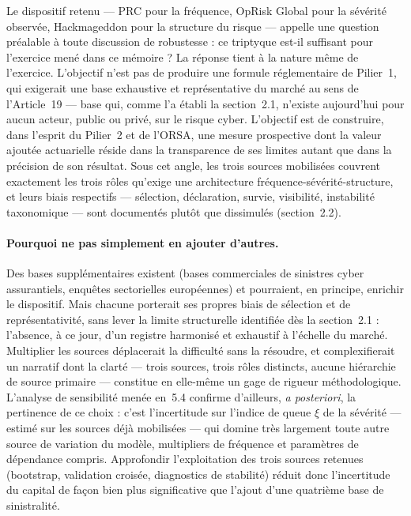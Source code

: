 \documentclass[11pt,a4paper]{article}
\theoremstyle{navystyle}
\theoremstyle{navydef}
\begin{document}
Le dispositif retenu --- PRC pour la fréquence, OpRisk Global pour la
sévérité observée, Hackmageddon pour la structure du risque --- appelle une
question préalable à toute discussion de robustesse : ce triptyque est-il
suffisant pour l'exercice mené dans ce mémoire ? La réponse tient à la nature
même de l'exercice. L'objectif n'est pas de produire une formule
réglementaire de Pilier~1, qui exigerait une base exhaustive et représentative
du marché au sens de l'Article~19 --- base qui, comme l'a établi la
section~2.1, n'existe aujourd'hui pour aucun acteur, public ou privé, sur le
risque cyber. L'objectif est de construire, dans l'esprit du Pilier~2 et de
l'ORSA, une mesure prospective dont la valeur ajoutée actuarielle réside dans
la transparence de ses limites autant que dans la précision de son résultat.
Sous cet angle, les trois sources mobilisées couvrent exactement les trois
rôles qu'exige une architecture fréquence-sévérité-structure, et leurs biais
respectifs --- sélection, déclaration, survie, visibilité, instabilité
taxonomique --- sont documentés plutôt que dissimulés (section~2.2).

\paragraph{Pourquoi ne pas simplement en ajouter d'autres.} Des bases
supplémentaires existent (bases commerciales de sinistres cyber assurantiels,
enquêtes sectorielles européennes) et pourraient, en principe, enrichir le
dispositif. Mais chacune porterait ses propres biais de sélection et de
représentativité, sans lever la limite structurelle identifiée dès la
section~2.1 : l'absence, à ce jour, d'un registre harmonisé et exhaustif à
l'échelle du marché. Multiplier les sources déplacerait la difficulté sans la
résoudre, et complexifierait un narratif dont la clarté --- trois sources, trois
rôles distincts, aucune hiérarchie de \og source primaire\fg{} --- constitue
en elle-même un gage de rigueur méthodologique. L'analyse de sensibilité menée
en~5.4 confirme d'ailleurs, \emph{a posteriori}, la pertinence de ce choix :
c'est l'incertitude sur l'indice de queue $\xi$ de la sévérité --- estimé sur
les sources déjà mobilisées --- qui domine très largement toute autre source
de variation du modèle, multipliers de fréquence et paramètres de dépendance
compris. Approfondir l'exploitation des trois sources retenues (bootstrap,
validation croisée, diagnostics de stabilité) réduit donc l'incertitude du
capital de façon bien plus significative que l'ajout d'une quatrième base de
sinistralité.
\end{document}
